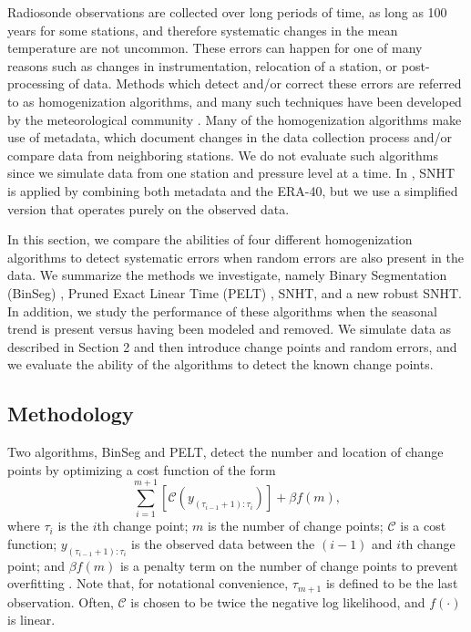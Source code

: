 \documentclass[12pt]{article}
\begin{document}
\begin{doublespacing}
Radiosonde observations are collected over long periods of time, as long as 100 years for some stations, and therefore systematic changes in the mean temperature are not uncommon.  These errors can happen for one of many reasons such as changes in instrumentation, relocation of a station, or post-processing of data.  Methods which detect and/or correct these errors are referred to as homogenization algorithms, and many such techniques have been developed by the meteorological community \cite{alexandersson86, domonkos13, gruber08, haimberger07, lanzante03, li14, lu10, venema12}.  Many of the homogenization algorithms make use of metadata, which document changes in the data collection process and/or compare data from neighboring stations.  We do not evaluate such algorithms since we simulate data from one station and pressure level at a time.  In \cite{haimberger07}, SNHT is applied by combining both metadata and the ERA-40, but we use a simplified version that operates purely on the observed data.

In this section, we compare the abilities of four different homogenization algorithms to detect systematic errors when random errors are also present in the data.  We summarize the methods we investigate, namely Binary Segmentation (BinSeg) \cite{scott74}, Pruned Exact Linear Time (PELT) \cite{killick12}, SNHT, and a new robust SNHT.  In addition, we study the performance of these algorithms when the seasonal trend is present versus having been modeled and removed.  We simulate data as described in Section 2 and then introduce change points and random errors, and we evaluate the ability of the algorithms to detect the known change points. 

\subsection{Methodology}
\label{ssec:methodology}

Two algorithms, BinSeg and PELT, detect the number and location of change points by optimizing a cost function of the form
\begin{equation}
	\sum_{i=1}^{m+1} [\mathcal{C}(y_{(\tau_{i-1}+1):\tau_i})] + \beta f(m),
	\label{eq:cost}
\end{equation}
where $\tau_i$ is the $i$th change point; $m$ is the number of change points; $\mathcal{C}$ is a cost function; $y_{(\tau_{i-1}+1):\tau_i}$ is the observed data between the $(i-1)$ and $i$th change point; and $\beta f(m)$ is a penalty term on the number of change points to prevent overfitting \cite{killick12}.  Note that, for notational convenience, $\tau_{m+1}$ is defined to be the last observation.  Often, $\mathcal{C}$ is chosen to be twice the negative log likelihood, and $f(\cdot)$ is linear.


\end{doublespacing}
\end{document}
